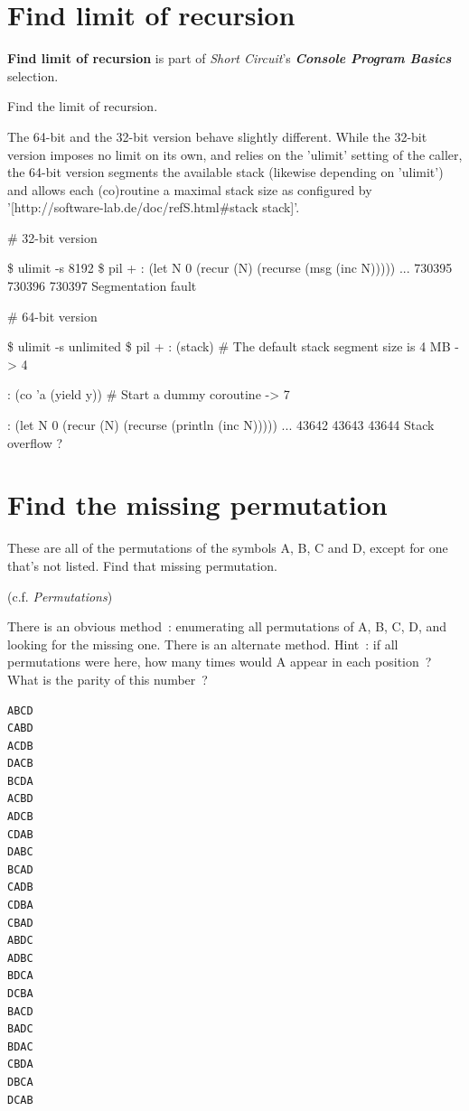 \pagebreak{}
\section*{Find limit of recursion}

\textbf{Find limit of recursion} is part of \emph{Short Circuit}'s
\textbf{\emph{Console Program Basics}} selection.

Find the limit of recursion.

\begin{wideverbatim}

  The 64-bit and the 32-bit version behave slightly different. While
  the 32-bit version imposes no limit on its own, and relies on the
  'ulimit' setting of the caller, the 64-bit version segments the
  available stack (likewise depending on 'ulimit') and allows each
  (co)routine a maximal stack size as configured by
  '[http://software-lab.de/doc/refS.html#stack stack]'.

# 32-bit version

\$ ulimit -s
8192
\$ pil +
: (let N 0 (recur (N) (recurse (msg (inc N)))))
...
730395
730396
730397
Segmentation fault

# 64-bit version

\$ ulimit -s
unlimited
\$ pil +
: (stack)  # The default stack segment size is 4 MB
-> 4

: (co 'a (yield y))  # Start a dummy coroutine
-> 7

: (let N 0 (recur (N) (recurse (println (inc N)))))
...
43642
43643
43644
Stack overflow
?

\end{wideverbatim}

\pagebreak{}
\section*{Find the missing permutation}

These are all of the permutations of the symbols A, B, C and D, except
for one that's not listed. Find that missing permutation.

(c.f. \emph{Permutations})

There is an obvious method~: enumerating all permutations of A, B, C, D,
and looking for the missing one. There is an alternate method. Hint~: if
all permutations were here, how many times would A appear in each
position~? What is the parity of this number~?

\begin{verbatim}
ABCD
CABD
ACDB
DACB
BCDA
ACBD
ADCB
CDAB
DABC
BCAD
CADB
CDBA
CBAD
ABDC
ADBC
BDCA
DCBA
BACD
BADC
BDAC
CBDA
DBCA
DCAB
\end{verbatim}


